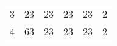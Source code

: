 \begin{table}[h]
    \centering
    \begin{tabular}{c|c|c|c|c|c}
        3 &  23 &  23 &  23 &  23 &  2\\
         4& 63 &  23 &  23 &  23 &  2
    \end{tabular}
    
    \label{tab:my_label}
\end{table}